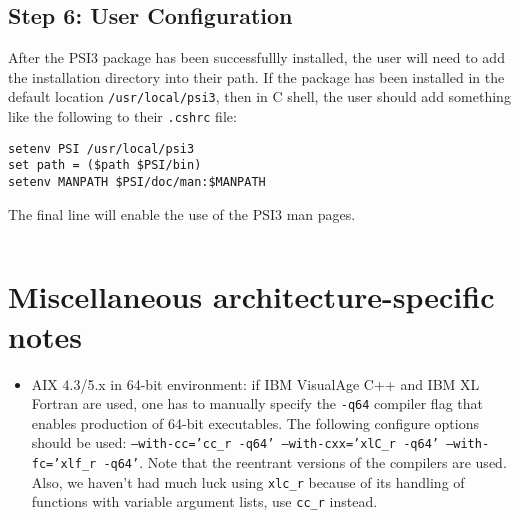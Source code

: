 \documentclass[12pt]{article}
\begin{document}
\subsection{Step 6: User Configuration}

After the PSI3 package has been successfullly installed, the user will
need to add the installation directory into their path.  If the package
has been installed in the default location {\tt /usr/local/psi3}, then
in C shell, the user should add something like the following to 
their {\tt .cshrc} file:
\begin{verbatim}
setenv PSI /usr/local/psi3
set path = ($path $PSI/bin)
setenv MANPATH $PSI/doc/man:$MANPATH
\end{verbatim}
The final line will enable the use of the PSI3 man pages.
\begin{verbatim}
\end{verbatim}


\section{Miscellaneous architecture-specific notes}
\begin{itemize}
\item AIX 4.3/5.x in 64-bit environment:
if IBM VisualAge C++ and IBM XL Fortran are used,
one has to manually specify
the {\tt -q64} compiler flag
that enables production of 64-bit executables.
The following configure options should be used:
{\tt --with-cc='cc\_r -q64' --with-cxx='xlC\_r -q64'
 --with-fc='xlf\_r -q64'}. Note that
the reentrant versions of the compilers
are used. Also, we haven't had much luck
using {\tt xlc\_r} because of its
handling of functions with variable argument lists,
use {\tt cc\_r} instead.
\end{itemize}
\end{document}
